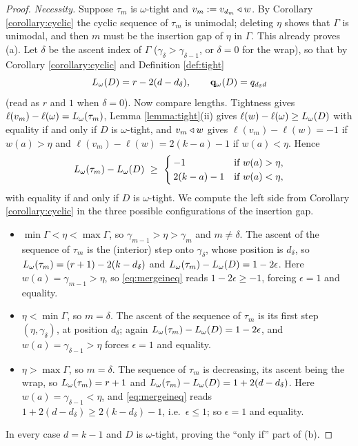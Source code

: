 \documentclass{amsart}
\theoremstyle{definition}
\theoremstyle{remark}
\numberwithin{equation}{section}
\begin{document}
\begin{proof}
\emph{Necessity.} Suppose $\tau_m$ is $\omega$-tight and $v_m:=v_{d_m}\triangleleft w$. By Corollary \ref{corollary:cyclic} the cyclic sequence of $\tau_m$ is unimodal; deleting $\eta$ shows that $\Gamma$ is unimodal, and then $m$ must be the insertion gap of $\eta$ in $\Gamma$. This already proves (a). Let $\delta$ be the ascent index of $\Gamma$ ($\gamma_\delta>\gamma_{\delta-1}$, or $\delta=0$ for the wrap), so that by Corollary \ref{corollary:cyclic} and Definition \ref{def:tight}
$$L_\omega(D)=r-2(d-d_\delta),\qquad \mathbf{q}_\omega(D)=q_{d_\delta d}$$
(read as $r$ and $1$ when $\delta=0$). Now compare lengths. Tightness gives $\ell(v_m)-\ell(\omega)=L_\omega(\tau_m)$, Lemma \ref{lemma:tight}(ii) gives $\ell(w)-\ell(\omega)\geq L_\omega(D)$ with equality if and only if $D$ is $\omega$-tight, and $v_m\triangleleft w$ gives $\ell(v_m)-\ell(w)=-1$ if $w(a)>\eta$ and $\ell(v_m)-\ell(w)=2(k-a)-1$ if $w(a)<\eta$. Hence
\begin{equation}\label{eq:mergeineq}
L_\omega(\tau_m)-L_\omega(D)\ \geq\ \begin{cases}-1&\text{if }w(a)>\eta,\\ 2(k-a)-1&\text{if }w(a)<\eta,\end{cases}
\end{equation}
with equality if and only if $D$ is $\omega$-tight. We compute the left side from Corollary \ref{corollary:cyclic} in the three possible configurations of the insertion gap.
\begin{itemize}
\item[(I)] $\min\Gamma<\eta<\max\Gamma$, so $\gamma_{m-1}>\eta>\gamma_m$ and $m\neq\delta$. The ascent of the sequence of $\tau_m$ is the (interior) step onto $\gamma_\delta$, whose position is $d_\delta$, so $L_\omega(\tau_m)=(r+1)-2(k-d_\delta)$ and $L_\omega(\tau_m)-L_\omega(D)=1-2\epsilon$. Here $w(a)=\gamma_{m-1}>\eta$, so \eqref{eq:mergeineq} reads $1-2\epsilon\geq-1$, forcing $\epsilon=1$ and equality.
\item[(II)] $\eta<\min\Gamma$, so $m=\delta$. The ascent of the sequence of $\tau_m$ is its first step $(\eta,\gamma_\delta)$, at position $d_\delta$; again $L_\omega(\tau_m)-L_\omega(D)=1-2\epsilon$, and $w(a)=\gamma_{\delta-1}>\eta$ forces $\epsilon=1$ and equality.
\item[(III)] $\eta>\max\Gamma$, so $m=\delta$. The sequence of $\tau_m$ is decreasing, its ascent being the wrap, so $L_\omega(\tau_m)=r+1$ and $L_\omega(\tau_m)-L_\omega(D)=1+2(d-d_\delta)$. Here $w(a)=\gamma_{\delta-1}<\eta$, and \eqref{eq:mergeineq} reads $1+2(d-d_\delta)\geq2(k-d_\delta)-1$, i.e.\ $\epsilon\leq1$; so $\epsilon=1$ and equality.
\end{itemize}
In every case $d=k-1$ and $D$ is $\omega$-tight, proving the ``only if'' part of (b).


\end{proof}
\end{document}
